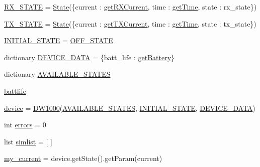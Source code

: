 \begin{DoxyCompactItemize}
\item 
\mbox{\hyperlink{namespacesimlib_1_1_f_s_m_a40976a3c014ac65e694bcf59d259dcd5}{R\+X\+\_\+\+S\+T\+A\+TE}} = \mbox{\hyperlink{classsimlib_1_1_f_s_m_1_1_state}{State}}(\{\textquotesingle{}current\textquotesingle{} \+: \mbox{\hyperlink{namespacesimlib_1_1_f_s_m_a63cebb729f3311d63c6d9c4604dd7528}{get\+R\+X\+Current}}, \textquotesingle{}time\textquotesingle{} \+: \mbox{\hyperlink{namespacesimlib_1_1_f_s_m_a11348c0ee93cab46de076fcf8ec8395f}{get\+Time}}, \textquotesingle{}state\textquotesingle{} \+: \textquotesingle{}rx\+\_\+state\textquotesingle{}\})
\item 
\mbox{\hyperlink{namespacesimlib_1_1_f_s_m_ab521d6f43a80cf675f1f8c8897276bb2}{T\+X\+\_\+\+S\+T\+A\+TE}} = \mbox{\hyperlink{classsimlib_1_1_f_s_m_1_1_state}{State}}(\{\textquotesingle{}current\textquotesingle{} \+: \mbox{\hyperlink{namespacesimlib_1_1_f_s_m_acbc6fcdb50f1784bcbc559a80962816e}{get\+T\+X\+Current}}, \textquotesingle{}time\textquotesingle{} \+: \mbox{\hyperlink{namespacesimlib_1_1_f_s_m_a11348c0ee93cab46de076fcf8ec8395f}{get\+Time}}, \textquotesingle{}state\textquotesingle{} \+: \textquotesingle{}tx\+\_\+state\textquotesingle{}\})
\item 
\mbox{\hyperlink{namespacesimlib_1_1_f_s_m_a370ea88f722b665e583624f9245c102a}{I\+N\+I\+T\+I\+A\+L\+\_\+\+S\+T\+A\+TE}} = \mbox{\hyperlink{namespacesimlib_1_1_f_s_m_a7eb7aa74e342e04c15ef89a79cbbdb11}{O\+F\+F\+\_\+\+S\+T\+A\+TE}}
\item 
dictionary \mbox{\hyperlink{namespacesimlib_1_1_f_s_m_acf009361a37b6f0f5041c0291e79e6cc}{D\+E\+V\+I\+C\+E\+\_\+\+D\+A\+TA}} = \{\textquotesingle{}batt\+\_\+life\textquotesingle{} \+: \mbox{\hyperlink{namespacesimlib_1_1_f_s_m_a61b3092e8c2bea57757c200b5cd1142d}{get\+Battery}}\}
\item 
dictionary \mbox{\hyperlink{namespacesimlib_1_1_f_s_m_a73284019a2ab444d9556c97e7fbecaec}{A\+V\+A\+I\+L\+A\+B\+L\+E\+\_\+\+S\+T\+A\+T\+ES}}
\item 
\mbox{\hyperlink{namespacesimlib_1_1_f_s_m_a5284a2db218c3d24e2cd3228c03a02a3}{battlife}}
\item 
\mbox{\hyperlink{namespacesimlib_1_1_f_s_m_a73ed1e1b900ec529305fc53518fa0470}{device}} = \mbox{\hyperlink{classsimlib_1_1_f_s_m_1_1_d_w1000}{D\+W1000}}(\mbox{\hyperlink{namespacesimlib_1_1_f_s_m_a73284019a2ab444d9556c97e7fbecaec}{A\+V\+A\+I\+L\+A\+B\+L\+E\+\_\+\+S\+T\+A\+T\+ES}}, \mbox{\hyperlink{namespacesimlib_1_1_f_s_m_a370ea88f722b665e583624f9245c102a}{I\+N\+I\+T\+I\+A\+L\+\_\+\+S\+T\+A\+TE}}, \mbox{\hyperlink{namespacesimlib_1_1_f_s_m_acf009361a37b6f0f5041c0291e79e6cc}{D\+E\+V\+I\+C\+E\+\_\+\+D\+A\+TA}})
\item 
int \mbox{\hyperlink{namespacesimlib_1_1_f_s_m_aff891129d4aee54ac02d325c3ca3bc1f}{errors}} = 0
\item 
list \mbox{\hyperlink{namespacesimlib_1_1_f_s_m_a1ec74a60b04404cc05b664aac846602e}{simlist}} = \mbox{[} \mbox{]}
\item 
\mbox{\hyperlink{namespacesimlib_1_1_f_s_m_aed7c7e938d92046714b1fae6f01853c0}{my\+\_\+current}} = device.\+get\+State().get\+Param(\textquotesingle{}current\textquotesingle{})
\end{DoxyCompactItemize}


